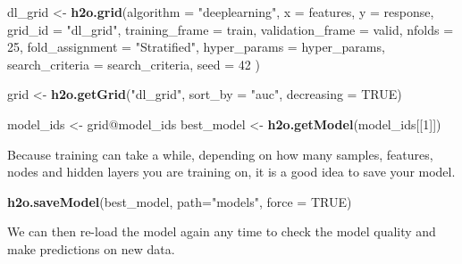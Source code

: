 \documentclass[]{article}
\newenvironment{Shaded}{\begin{snugshade}}{\end{snugshade}}
\newcommand{\KeywordTok}[1]{\textcolor[rgb]{0.13,0.29,0.53}{\textbf{{#1}}}}
\newcommand{\DataTypeTok}[1]{\textcolor[rgb]{0.13,0.29,0.53}{{#1}}}
\newcommand{\DecValTok}[1]{\textcolor[rgb]{0.00,0.00,0.81}{{#1}}}
\newcommand{\StringTok}[1]{\textcolor[rgb]{0.31,0.60,0.02}{{#1}}}
\newcommand{\OtherTok}[1]{\textcolor[rgb]{0.56,0.35,0.01}{{#1}}}
\newcommand{\NormalTok}[1]{{#1}}
\begin{document}
\begin{Shaded}
\begin{Highlighting}[]
\NormalTok{dl_grid <-}\StringTok{ }\KeywordTok{h2o.grid}\NormalTok{(}\DataTypeTok{algorithm =} \StringTok{"deeplearning"}\NormalTok{, }
                    \DataTypeTok{x =} \NormalTok{features,}
                    \DataTypeTok{y =} \NormalTok{response,}
                    \DataTypeTok{grid_id =} \StringTok{"dl_grid"}\NormalTok{,}
                    \DataTypeTok{training_frame =} \NormalTok{train,}
                    \DataTypeTok{validation_frame =} \NormalTok{valid,}
                    \DataTypeTok{nfolds =} \DecValTok{25}\NormalTok{,                           }
                    \DataTypeTok{fold_assignment =} \StringTok{"Stratified"}\NormalTok{,}
                    \DataTypeTok{hyper_params =} \NormalTok{hyper_params,}
                    \DataTypeTok{search_criteria =} \NormalTok{search_criteria,}
                    \DataTypeTok{seed =} \DecValTok{42}
                    \NormalTok{)}
\end{Highlighting}
\end{Shaded}

\begin{Shaded}
\begin{Highlighting}[]
\NormalTok{grid <-}\StringTok{ }\KeywordTok{h2o.getGrid}\NormalTok{(}\StringTok{"dl_grid"}\NormalTok{, }\DataTypeTok{sort_by =} \StringTok{"auc"}\NormalTok{, }\DataTypeTok{decreasing =} \OtherTok{TRUE}\NormalTok{)}
  
\NormalTok{model_ids <-}\StringTok{ }\NormalTok{grid@model_ids}
\NormalTok{best_model <-}\StringTok{ }\KeywordTok{h2o.getModel}\NormalTok{(model_ids[[}\DecValTok{1}\NormalTok{]])}
\end{Highlighting}
\end{Shaded}

Because training can take a while, depending on how many samples,
features, nodes and hidden layers you are training on, it is a good idea
to save your model.

\begin{Shaded}
\begin{Highlighting}[]
\KeywordTok{h2o.saveModel}\NormalTok{(best_model, }\DataTypeTok{path=}\StringTok{"models"}\NormalTok{, }\DataTypeTok{force =} \OtherTok{TRUE}\NormalTok{)}
\end{Highlighting}
\end{Shaded}

We can then re-load the model again any time to check the model quality
and make predictions on new data.
\end{document}
